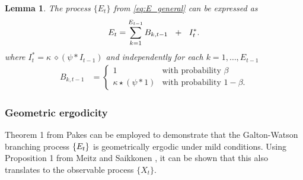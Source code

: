 \documentclass{article}
\newtheorem{lemma}{Lemma}
\begin{document}
\begin{lemma}
The process $\{E_t\}$ from \eqref{eq:E_general} can be expressed as
\begin{equation}
E_t = \sum_{k = 1}^{E_{t - 1}} B_{k, t - 1} \ \ + \ \ I^*_t.
\label{eq:galton_watson}
\end{equation}
where $I^*_t = \kappa\ \diamond (\psi * I_{t - 1})$ and independently for each $k = 1, \dots, E_{t - 1}$
\begin{align}
B_{k, t - 1} & = \begin{cases}
1 & \text{with probability } \beta\\ %
\kappa \star (\psi * 1) & \text{with probability } 1 - \beta. %
\label{eq:Z_t_i}
\end{cases}
\end{align}
\end{lemma}


\subsubsection{Geometric ergodicity}

Theorem 1 from Pakes \cite{Pakes1971} can be employed to demonstrate that the Galton-Watson branching process $\{E_t\}$ is geometrically ergodic under mild conditions. Using Proposition 1 from Meitz and Saikkonen \cite{Meitz2008}, it can be shown that this also translates to the observable process $\{X_t\}$.
\end{document}
